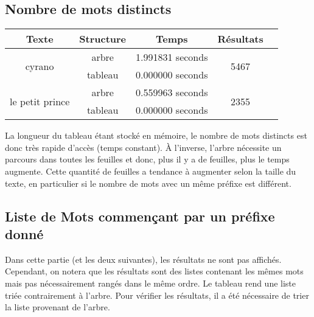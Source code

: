 \documentclass[a4paper,12pt]{article}
\begin{document}
\subsection{Nombre de mots distincts}
\begin{center}
  \begin{tabular}{|c|c|c|c|c|}
    \hline
    Texte & Structure & Temps & Résultats\\
    \hline
    \multirow{2}{*}{cyrano} & arbre & 1.991831 seconds & \multirow{2}{*}{5467}\\
    \cline{2-3}
    & tableau & 0.000000 seconds & \\
    \hline
    \multirow{2}{*}{le petit prince} & arbre & 0.559963 seconds & \multirow{2}{*}{2355}\\
    \cline{2-3}
    & tableau & 0.000000 seconds & \\
    \hline
  \end{tabular}
\end{center}

La longueur du tableau étant stocké en mémoire, le nombre de mots distincts est donc très rapide d'accès (temps constant). \`A l'inverse, l'arbre nécessite un parcours dans toutes les feuilles et donc, plus il y a de feuilles, plus le temps augmente. Cette quantité de feuilles a tendance à augmenter selon la taille du texte, en particulier si le nombre de mots avec un même préfixe est différent.


\subsection{Liste de Mots commençant par un préfixe donné}
Dans cette partie (et les deux suivantes), les résultats ne sont pas affichés. Cependant, on notera que les résultats sont des listes contenant les mêmes mots mais pas nécessairement rangés dans le même ordre. Le tableau rend une liste triée contrairement à l'arbre. Pour vérifier les résultats, il a été nécessaire de trier la liste provenant de l'arbre.
\end{document}

